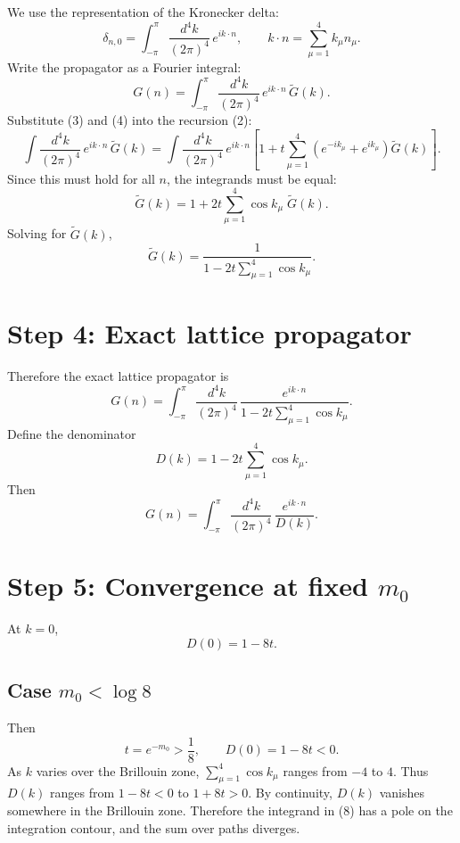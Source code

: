 \documentclass[12pt]{article}
\begin{document}
We use the representation of the Kronecker delta:
\begin{equation}
\delta_{n,0}
=
\int_{-\pi}^{\pi}\frac{d^4k}{(2\pi)^4}\,e^{ik\cdot n},
\qquad
k\cdot n=\sum_{\mu=1}^4 k_\mu n_\mu.
\tag{3}
\end{equation}
Write the propagator as a Fourier integral:
\begin{equation}
G(n)=
\int_{-\pi}^{\pi}\frac{d^4k}{(2\pi)^4}\,
e^{ik\cdot n}\,\widetilde G(k).
\tag{4}
\end{equation}
Substitute (3) and (4) into the recursion (2):
\[
\int\frac{d^4k}{(2\pi)^4}\,e^{ik\cdot n}\,\widetilde G(k)
=
\int\frac{d^4k}{(2\pi)^4}\,e^{ik\cdot n}
\left[
1
+
t\sum_{\mu=1}^4
\left(
e^{-ik_\mu}+e^{ik_\mu}
\right)
\widetilde G(k)
\right].
\]
Since this must hold for all \(n\), the integrands must be equal:
\[
\widetilde G(k)
=
1
+
2t\sum_{\mu=1}^4\cos k_\mu\;\widetilde G(k).
\]
Solving for \(\widetilde G(k)\),
\begin{equation}
\widetilde G(k)
=
\frac{1}{
1-2t\sum_{\mu=1}^4\cos k_\mu
}.
\tag{5}
\end{equation}

\section{Step 4: Exact lattice propagator}

Therefore the exact lattice propagator is
\begin{equation}
\boxed{
G(n)
=
\int_{-\pi}^{\pi}\frac{d^4k}{(2\pi)^4}\,
\frac{e^{ik\cdot n}}{
1-2t\sum_{\mu=1}^4\cos k_\mu
}.
}
\tag{6}
\end{equation}
Define the denominator
\begin{equation}
D(k)=1-2t\sum_{\mu=1}^4\cos k_\mu.
\tag{7}
\end{equation}
Then
\begin{equation}
G(n)=
\int_{-\pi}^{\pi}\frac{d^4k}{(2\pi)^4}\,
\frac{e^{ik\cdot n}}{D(k)}.
\tag{8}
\end{equation}

\section{Step 5: Convergence at fixed \(m_0\)}

At \(k=0\),
\begin{equation}
D(0)=1-8t.
\tag{9}
\end{equation}

\subsection{Case \(m_0<\log 8\)}
Then
\[
t=e^{-m_0}>\frac18,
\qquad
D(0)=1-8t<0.
\]
As \(k\) varies over the Brillouin zone, \(\sum_{\mu=1}^4\cos k_\mu\) ranges from \(-4\) to \(4\).  
Thus \(D(k)\) ranges from \(1-8t<0\) to \(1+8t>0\).  
By continuity, \(D(k)\) vanishes somewhere in the Brillouin zone.  
Therefore the integrand in (8) has a pole on the integration contour, and the sum over paths diverges.
\end{document}
